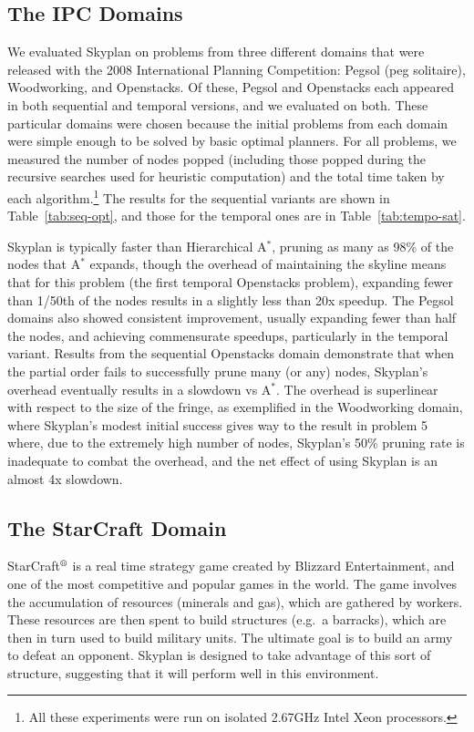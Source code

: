 \documentclass[letterpaper]{article}
\theoremstyle{plain} \newtheorem{theorem}{Theorem} \newtheorem{proposition}{Proposition} \newtheorem{lemma}{Lemma}
\theoremstyle{definition} \newtheorem{definition}{Definition} \newtheorem{conjecture}{Conjecture} \newtheorem*{example}{Example}
\theoremstyle{remark} \newtheorem*{remark}{Remark} \newtheorem*{note}{Note} \newtheorem{case}{Case}
\newcommand{\Astar}{A$^*$ }
\newcommand{\Astarpunct}{A$^*$}
\begin{document}
\subsection{The IPC Domains}

We evaluated Skyplan on problems from three different domains that were released with the 2008 International
Planning Competition: Pegsol (peg solitaire), Woodworking, and Openstacks. Of these, Pegsol and Openstacks
each appeared in both sequential and temporal versions, and we evaluated on both. These particular domains were
chosen because the initial problems from each domain were simple enough to be solved by basic optimal 
planners. For all problems, we measured
the number of nodes popped (including those popped during the recursive searches used
for heuristic computation) and the total time taken by each algorithm.\footnote{All
these experiments were run on isolated 2.67GHz Intel Xeon processors.} The results for the sequential variants
are shown in Table~\ref{tab:seq-opt}, and those for the temporal ones are in Table~\ref{tab:tempo-sat}.

Skyplan is typically faster than Hierarchical \Astarpunct, pruning as many as 98\% of the nodes that \Astar
expands, though the overhead of maintaining the skyline means that for this problem (the first temporal
Openstacks problem), expanding fewer than 1/50th of the nodes results in a slightly less than 20x speedup. The
Pegsol domains also showed consistent improvement, usually expanding fewer than half the nodes, and achieving
commensurate speedups, particularly in the temporal variant. Results from the sequential Openstacks domain
demonstrate that when the partial order fails to successfully prune many (or any) nodes, Skyplan's overhead
eventually results in a slowdown vs \Astarpunct. The overhead is superlinear with respect to the size of the
fringe, as exemplified in the Woodworking domain, where Skyplan's modest initial success gives way to the
result in problem 5 where, due to the extremely high number of nodes, Skyplan's 50\% pruning rate is inadequate
to combat the overhead, and the net effect of using Skyplan is an almost 4x slowdown.


\subsection{The StarCraft Domain}

StarCraft$^\textrm{\textregistered}$ is a real time strategy game
created by Blizzard Entertainment, and one of the most competitive
and popular games in the world. The game involves the accumulation
of resources (minerals and gas), which are gathered by workers.
These resources are then spent to build structures (e.g.\ a barracks),
which are then in turn used to build military units. The ultimate goal is
to build an army to defeat an opponent. 
Skyplan is designed to take advantage of this sort of structure,
suggesting that it will perform well in this environment.
\end{document}
